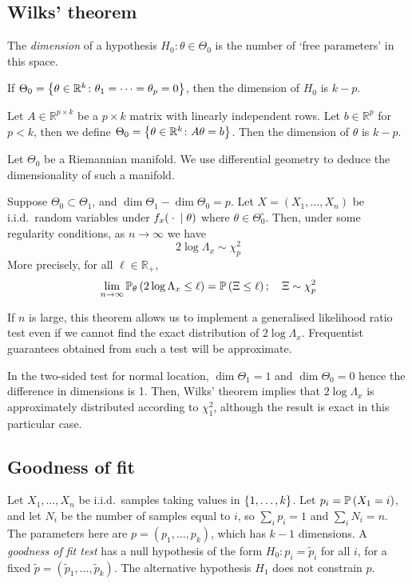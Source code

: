 \subsection{Wilks' theorem}
\begin{definition}
	The \textit{dimension} of a hypothesis \( H_0 \colon \theta \in \Theta_0 \) is the number of `free parameters' in this space.
\end{definition}
\begin{example}
	If \( \Theta_0 = \qty{\theta \in \mathbb R^k \colon \theta_1 = \dots = \theta_p = 0 } \), then the dimension of \( H_0 \) is \( k - p \).

	Let \( A \in \mathbb R^{p \times k} \) be a \( p \times k \) matrix with linearly independent rows.
	Let \( b \in \mathbb R^p \) for \( p < k \), then we define \( \Theta_0 = \qty{\theta \in \mathbb R^k \colon A\theta = b} \).
	Then the dimension of \( \theta \) is \( k - p \).

	Let \( \Theta_0 \) be a Riemannian manifold.
	We use differential geometry to deduce the dimensionality of such a manifold.
\end{example}
\begin{theorem}
	Suppose \( \Theta_0 \subset \Theta_1 \), and \( \dim \Theta_1 - \dim \Theta_0 = p \).
	Let \( X = (X_1, \dots, X_n) \) be i.i.d.\ random variables under \( f_x({}\cdot{}\mid\theta) \) where \( \theta \in \Theta_0^\circ \).
	Then, under some regularity conditions, as \( n \to \infty \) we have
	\[
		2\log\Lambda_x \sim \chi_p^2
	\]
	More precisely, for all \( \ell \in \mathbb R_+ \),
	\[
		\lim_{n \to \infty} \mathbb{P}_{\theta}\left({2\log \Lambda_x \leq \ell}\right) = \mathbb{P}\left({\Xi \leq \ell}\right);\quad \Xi \sim \chi_p^2
	\]
\end{theorem}
\begin{remark}
	If \( n \) is large, this theorem allows us to implement a generalised likelihood ratio test even if we cannot find the exact distribution of \( 2 \log \Lambda_x \).
	Frequentist guarantees obtained from such a test will be approximate.
\end{remark}
\begin{example}
	In the two-sided test for normal location, \( \dim \Theta_1 = 1 \) and \( \dim \Theta_0 = 0 \) hence the difference in dimensions is 1.
	Then, Wilks' theorem implies that \( 2 \log \Lambda_x \) is approximately distributed according to \( \chi_1^2 \), although the result is exact in this particular case.
\end{example}

\subsection{Goodness of fit}
Let \( X_1, \dots, X_n \) be i.i.d.\ samples taking values in \( \qty{1, \dots, k} \).
Let \( p_i = \mathbb{P}\left({X_1 = i}\right) \), and let \( N_i \) be the number of samples equal to \( i \), so \( \sum_i p_i = 1\) and \( \sum_i N_i = n \).
The parameters here are \( p = (p_1, \dots, p_k) \), which has \( k - 1 \) dimensions.
A \textit{goodness of fit test} has a null hypothesis of the form \( H_0 \colon p_i = \widetilde p_i \) for all \( i \), for a fixed \( \widetilde p = (\widetilde p_1, \dots, \widetilde p_k) \).
The alternative hypothesis \( H_1 \) does not constrain \( p \).


